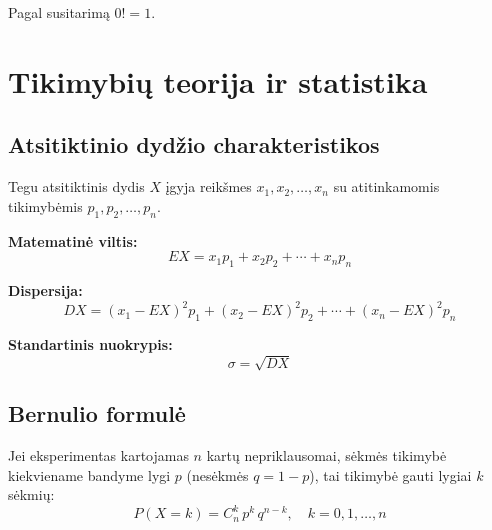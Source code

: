 \begin{remark}
Pagal susitarimą $0! = 1$.
\end{remark}

\section{Tikimybių teorija ir statistika}

\subsection{Atsitiktinio dydžio charakteristikos}

Tegu atsitiktinis dydis $X$ įgyja reikšmes $x_1, x_2, \ldots, x_n$
su atitinkamomis tikimybėmis $p_1, p_2, \ldots, p_n$.

\textbf{Matematinė viltis:}
\[
EX = x_1 p_1 + x_2 p_2 + \cdots + x_n p_n
\]

\textbf{Dispersija:}
\[
DX = (x_1 - EX)^2 p_1 + (x_2 - EX)^2 p_2 + \cdots + (x_n - EX)^2 p_n
\]

\textbf{Standartinis nuokrypis:}
\[
\sigma = \sqrt{DX}
\]

\subsection{Bernulio formulė}

Jei eksperimentas kartojamas $n$ kartų nepriklausomai, sėkmės tikimybė kiekviename
bandyme lygi $p$ (nesėkmės $q = 1-p$), tai tikimybė gauti lygiai $k$ sėkmių:
\[
P(X = k) = C_n^k \, p^k \, q^{n-k}, \quad k = 0, 1, \ldots, n
\]


